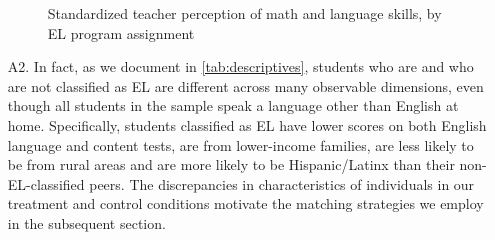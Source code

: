 \documentclass[a4paper, 11pt]{article}
\begin{document}
\begin{enumerate}
	\begin{figure}
		\begin{center}
			\caption{Standardized teacher perception of math and language skills, by EL program assignment} \label{fig:raw}
		\end{center}
	\end{figure}


	\item[A2.] In fact, as we document in \autoref{tab:descriptives}, students who are and who are not classified as EL are different across many observable dimensions, even though all students in the sample speak a language other than English at home. Specifically, students classified as EL have lower scores on both English language and content tests, are from lower-income families, are less likely to be from rural areas and are more likely to be Hispanic/Latinx than their non-EL-classified peers. The discrepancies in characteristics of individuals in our treatment and control conditions motivate the matching strategies we employ in the subsequent section. 


\end{enumerate}
\end{document}

